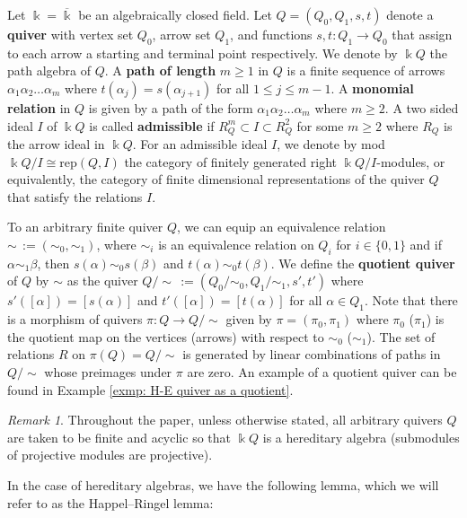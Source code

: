 \documentclass[12pt]{amsart}
\theoremstyle{plain}
\theoremstyle{definition}
\theoremstyle{remark}
\newtheorem{rem}{Remark}[section]
\begin{document}
Let $\Bbbk = \overline{\Bbbk}$ be an algebraically closed field. Let $Q=(Q_0,Q_1,s,t)$ denote a \textbf{quiver} with vertex set $Q_0$, arrow set $Q_1$, and functions $s,t:Q_1 \rightarrow Q_0$ that assign to each arrow a starting and terminal point respectively. We denote by $\Bbbk Q$ the path algebra of $Q$. A \textbf{path of length} $m \geq1$ in $Q$ is a finite sequence of arrows $\alpha_1\alpha_2\dots\alpha_m$ where $t(\alpha_j) = s(\alpha_{j+1})$ for all $1 \leq j \leq m-1$. A \textbf{monomial relation} in $Q$ is given by a path of the form $\alpha_1\alpha_2\dots\alpha_m$ where $m\geq 2$. A two sided ideal $I$ of $\Bbbk Q$ is called \textbf{admissible} if $R^m_Q \subset I \subset R^2_Q$ for some $m \geq 2$ where $R_Q$ is the arrow ideal in $\Bbbk Q$. For an admissible ideal $I$, we denote by mod$\Bbbk Q/I \cong \text{rep} (Q,I)$ the category of finitely generated right $\Bbbk Q/I$-modules, or equivalently, the category of finite dimensional representations of the quiver $Q$ that satisfy the relations $I$. 

To an arbitrary finite quiver $Q$, we can equip an equivalence relation $\sim \, := (\sim_0, \sim_1)$, where $\sim_i$ is an equivalence relation on $Q_i$ for $i \in \{0,1\}$ and if $\alpha \sim_1 \beta$, then $s(\alpha) \sim_0 s(\beta)$ and $t(\alpha) \sim_0 t(\beta)$. We define the \textbf{quotient quiver} of $Q$ by $\sim$ as the quiver $Q/\sim \, := (Q_0/\sim_0, Q_1/\sim_1, s',t')$ where $s'([\alpha]) = [s(\alpha)]$ and $t'([\alpha]) = [t(\alpha)]$ for all $\alpha \in Q_1$. Note that there is a morphism of quivers $\pi: Q \rightarrow Q/\sim$ given by $\pi = (\pi_0,\pi_1)$ where $\pi_0$ ($\pi_1$) is the quotient map on the vertices (arrows) with respect to $\sim_0$ ($\sim_1$). The set of relations $R$ on $\pi(Q) = Q/\sim$ is generated by linear combinations of paths in $Q/\sim$ whose preimages under $\pi$ are zero. {An example of a quotient quiver can be found in Example \ref{exmp: H-E quiver as a quotient}.}

\begin{rem}

Throughout the paper, unless otherwise stated, all arbitrary quivers $Q$ are taken to be finite and acyclic so that $\Bbbk Q$ is a hereditary algebra (submodules of projective modules are projective).

\end{rem}

In the case of hereditary algebras, we have the following lemma, which we will refer to as the Happel--Ringel lemma:
\end{document}
